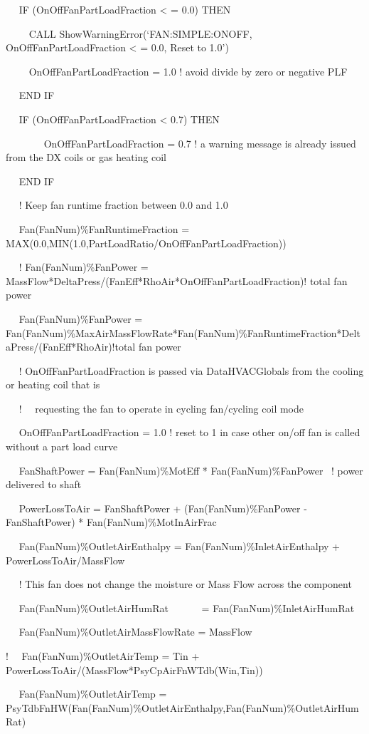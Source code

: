 ~~ IF (OnOffFanPartLoadFraction \textless{} = 0.0) THEN

~~~~ CALL ShowWarningError(`FAN:SIMPLE:ONOFF, OnOffFanPartLoadFraction \textless{} = 0.0, Reset to 1.0')

~~~~ OnOffFanPartLoadFraction = 1.0 ! avoid divide by zero or negative PLF

~~ END IF

~~ IF (OnOffFanPartLoadFraction \textless{} 0.7) THEN

~~~~~~~ OnOffFanPartLoadFraction = 0.7 ! a warning message is already issued from the DX coils or gas heating coil

~~ END IF

~~ ! Keep fan runtime fraction between 0.0 and 1.0

~~ Fan(FanNum)\%FanRuntimeFraction = MAX(0.0,MIN(1.0,PartLoadRatio/OnOffFanPartLoadFraction))

~~ ! Fan(FanNum)\%FanPower = MassFlow*DeltaPress/(FanEff*RhoAir*OnOffFanPartLoadFraction)! total fan power

~~ Fan(FanNum)\%FanPower = Fan(FanNum)\%MaxAirMassFlowRate*Fan(FanNum)\%FanRuntimeFraction*DeltaPress/(FanEff*RhoAir)!total fan power

~~ ! OnOffFanPartLoadFraction is passed via DataHVACGlobals from the cooling or heating coil that is

~~ !~~ requesting the fan to operate in cycling fan/cycling coil mode

~~ OnOffFanPartLoadFraction = 1.0 ! reset to 1 in case other on/off fan is called without a part load curve

~~ FanShaftPower = Fan(FanNum)\%MotEff * Fan(FanNum)\%FanPower~ ! power delivered to shaft

~~ PowerLossToAir = FanShaftPower + (Fan(FanNum)\%FanPower - FanShaftPower) * Fan(FanNum)\%MotInAirFrac

~~ Fan(FanNum)\%OutletAirEnthalpy = Fan(FanNum)\%InletAirEnthalpy + PowerLossToAir/MassFlow

~~ ! This fan does not change the moisture or Mass Flow across the component

~~ Fan(FanNum)\%OutletAirHumRat~~~~~~ = Fan(FanNum)\%InletAirHumRat

~~ Fan(FanNum)\%OutletAirMassFlowRate = MassFlow

!~~ Fan(FanNum)\%OutletAirTemp = Tin + PowerLossToAir/(MassFlow*PsyCpAirFnWTdb(Win,Tin))

~~ Fan(FanNum)\%OutletAirTemp = PsyTdbFnHW(Fan(FanNum)\%OutletAirEnthalpy,Fan(FanNum)\%OutletAirHumRat)


